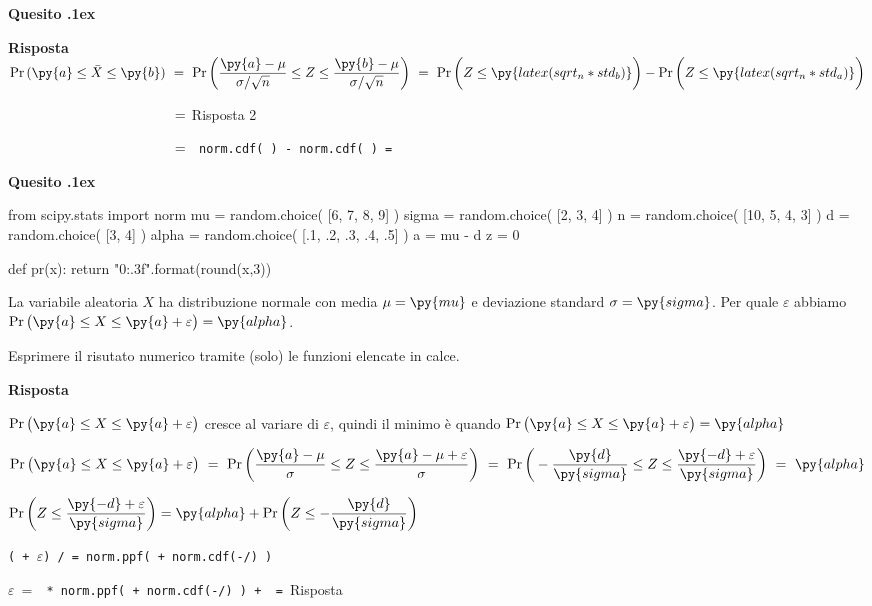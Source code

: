 \documentclass[11pt,twoside,a4paper]{article}
\def\Pr{{\rm Pr\,}}
\newcounter{quesito}
\newenvironment{question}{\addtocounter{quesito}{1}\bigskip\bigskip\par\textbf{Quesito \thequesito.\kern1ex}}{\vspace{\parskip}}
\newenvironment{answer}{\par\textbf{Risposta\quad}}{\vspace{\parskip}}
\begin{document}
\begin{question}
\begin{answer}
$\displaystyle \Pr(\py{a}\le\bar X\le\py{b})
\ =\ 
\Pr\bigg(\dfrac{\py{a}-\mu}{\sigma/\sqrt{n}}\le Z\le\dfrac{\py{b}-\mu}{\sigma/\sqrt{n}}\bigg)\ =\  \Pr\bigg(Z\le\py{latex(sqrt_n*std_b)}\bigg) -  \Pr\bigg(Z\le\py{latex(sqrt_n*std_a)}\bigg)$

$\phantom{\Pr\py{a}\le\bar X\le\py{b})}
\ =\ 
${\hfill Risposta 2}

$\phantom{\Pr\py{a}\le\bar X\le\py{b})}
\ =\ 
${\tt\ norm.cdf(  ) -  norm.cdf(  )
= 
}

\end{answer}
\end{question}



\begin{question} %
\begin{pycode}
from scipy.stats import norm
mu    = random.choice( [6, 7, 8, 9] )
sigma = random.choice( [2, 3, 4] )
n     = random.choice( [10, 5, 4, 3] )
d     = random.choice( [3, 4] )
alpha = random.choice( [.1, .2, .3, .4, .5] )
a = mu - d 
z = 0

def pr(x):
    return "{0:.3f}".format(round(x,3))
\end{pycode}
La variabile aleatoria $X$ ha distribuzione normale con media $\mu=\py{mu}$ e deviazione standard $\sigma=\py{sigma}$. 
Per quale $\varepsilon$ abbiamo $\Pr\big(\py{a}\le X\le\py{a}+\varepsilon\big)=\py{alpha}$.

Esprimere il risutato numerico tramite (solo) le funzioni elencate in calce. 
\begin{answer}

$\Pr\big(\py{a}\le X\le\py{a}+\varepsilon\big)$ cresce al variare di $\varepsilon$, quindi il minimo è quando $\Pr\big(\py{a}\le X\le\py{a}+\varepsilon\big)=\py{alpha}$\medskip

$\Pr\big(\py{a}\le X\le\py{a}+\varepsilon\big)
\ =\ 
\Pr\bigg(\dfrac{\py{a}-\mu}{\sigma}\le Z\le\dfrac{\py{a}-\mu+\varepsilon}{\sigma}\bigg)
\ =\ 
\Pr\bigg(-\dfrac{\py{d}}{\py{sigma}}\le Z\le\dfrac{\py{-d}+\varepsilon}{\py{sigma}}\bigg)\ =\ \py{alpha}$

$\Pr\bigg(Z\le\dfrac{\py{-d}+\varepsilon}{\py{sigma}}\bigg) = \py{alpha}+\Pr\bigg(Z\le-\dfrac{\py{d}}{\py{sigma}}\bigg)$\medskip

{\tt( + $\varepsilon$) /  = norm.ppf(  + norm.cdf(-/) ) }\medskip

$\varepsilon\ =\ ${\color{blue}\tt  {} * norm.ppf(  + norm.cdf(-/) ) +  }{\tt\ =\ }{\color{blue}\hfill Risposta}

\end{answer}
\end{question}
\end{document}
